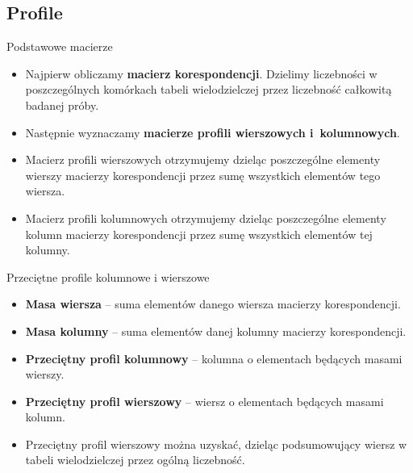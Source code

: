 \documentclass{beamer}
\begin{document}
\subsection{Profile}
\begin{frame}{Podstawowe macierze}
  \begin{itemize}
  \item Najpierw obliczamy \textbf{macierz korespondencji}. Dzielimy liczebności w poszczególnych komórkach tabeli wielodzielczej przez liczebność całkowitą badanej próby.
  \item Następnie wyznaczamy \textbf{macierze profili wierszowych i~kolumnowych}.
  \item Macierz profili wierszowych otrzymujemy dzieląc poszczególne elementy wierszy macierzy korespondencji przez sumę wszystkich elementów tego wiersza.
  \item Macierz profili kolumnowych otrzymujemy dzieląc poszczególne elementy kolumn macierzy korespondencji przez sumę wszystkich elementów tej kolumny.
  \end{itemize}
\end{frame}

\begin{frame}{Przeciętne profile kolumnowe i wierszowe}
  \begin{itemize}
  \item \textbf{Masa wiersza} -- suma elementów danego wiersza macierzy korespondencji.
  \item \textbf{Masa kolumny} -- suma elementów danej kolumny macierzy korespondencji.
  \item \textbf{Przeciętny profil kolumnowy}  -- kolumna o elementach będących masami wierszy.
  \item \textbf{Przeciętny profil wierszowy} -- wiersz o elementach będących masami kolumn.
  \item Przeciętny profil wierszowy można uzyskać, dzieląc podsumowujący wiersz w tabeli wielodzielczej przez ogólną liczebność.
  \end{itemize}
\end{frame}
\end{document}
